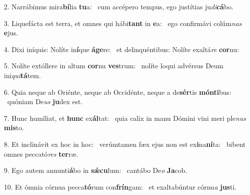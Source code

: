 2. Narrábimus mira\textbf{bí}lia \textbf{tu}a: \ast\  cum accépero tempus, ego justítias ju\textit{di}\textbf{cá}bo.\

3. Liquefácta est terra, et omnes qui hábi\textbf{tant} in \textbf{e}a: \ast\  ego confirmávi colúm\textit{nas} \textbf{e}jus.\

4. Dixi iníquis: Nolíte in\textbf{í}que \textbf{á}\textbf{ge}re: \ast\  et delinquéntibus: Nolíte exaltá\textit{re} \textbf{cor}nu:\

5. Nolíte extóllere in altum \textbf{cor}nu \textbf{ves}trum: \ast\  nolíte loqui advérsus Deum ini\textit{qui}\textbf{tá}tem.\

6. Quia neque ab Oriénte, neque ab Occidénte, neque a de\textbf{sér}tis \textbf{món}\textbf{ti}bus: \ast\  quóniam De\textit{us} \textbf{ju}dex est.\

7. Hunc humíliat, et \textbf{hunc} ex\textbf{ál}tat: \ast\  quia calix in manu Dómini vini meri ple\textit{nus} \textbf{mis}to.\

8. Et inclinávit ex hoc in hoc: \dag\  verúmtamen fæx ejus non est ex\textbf{i}na\textbf{ní}ta: \ast\  bibent omnes peccató\textit{res} \textbf{ter}ræ.\

9. Ego autem annunti\textbf{á}bo in \textbf{sǽ}\textbf{cu}lum: \ast\  cantábo De\textit{o} \textbf{Ja}cob.\

10. Et ómnia córnua pecca\textbf{tó}rum con\textbf{frín}gam: \ast\  et exaltabúntur córnu\textit{a} \textbf{jus}ti.\


